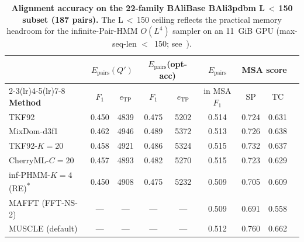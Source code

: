 \documentclass[11pt]{article}
\theoremstyle{definition}
\theoremstyle{remark}
\begin{document}
\begin{table}[t]
\centering
\footnotesize
\setlength{\tabcolsep}{4pt}
\begin{tabular}{lcccccccc}
\toprule
& \multicolumn{2}{c}{$E_{\mathrm{pairs}}(Q')$} & \multicolumn{2}{c}{$E_{\mathrm{pairs}}$(opt-acc)} & $E_{\mathrm{pairs}}$ & \multicolumn{2}{c}{MSA score} \\
\cmidrule(lr){2-3}\cmidrule(lr){4-5}\cmidrule(lr){7-8}
\textbf{Method} & $F_1$ & $e_{\mathrm{TP}}$ & $F_1$ & $e_{\mathrm{TP}}$ & in MSA $F_1$ & SP & TC \\
\midrule
TKF92                          & 0.450 &  4839 & 0.475 &  5202 & 0.514 & 0.724 & 0.631 \\
MixDom-d3f1                    & 0.462 &  4946 & 0.489 &  5372 & 0.513 & 0.726 & 0.638 \\
TKF92-$K{=}20$                 & 0.458 &  4921 & 0.486 &  5324 & 0.515 & 0.732 & 0.637 \\
CherryML-$C{=}20$              & 0.457 &  4893 & 0.482 &  5270 & 0.515 & 0.723 & 0.629 \\
inf-PHMM-$K{=}4$ (RE)\textsuperscript{$\ast$}
 & 0.450 & 4908 & 0.475 & 5232 & 0.509 & 0.705 & 0.609 \\
\midrule
MAFFT (FFT-NS-2)                           &   --- &   --- &   --- &   --- & 0.509 & 0.691 & 0.558 \\
MUSCLE (default)                           &   --- &   --- &   --- &   --- & 0.512 & 0.760 & 0.662 \\
\bottomrule
\end{tabular}
\caption{\textbf{Alignment accuracy on the
22-family BAliBase BAli3pdbm L\,$<$\,150 subset (187 pairs).}
%
The L\,$<$\,150 ceiling reflects the practical memory headroom for the
infinite-Pair-HMM $O(L^4)$ sampler on an 11~GiB GPU (max-seq-len
$<$~150; see~).
}
\end{table}
\end{document}
